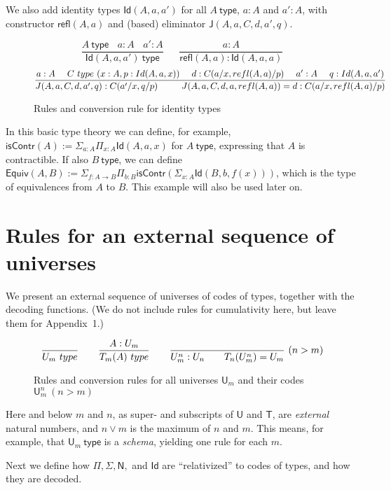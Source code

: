 \documentclass[a4paper,UKenglish,cleveref, autoref, thm-restate]{lipics-v2021}
\newcommand{\Id}{\mathsf{Id}}
\newcommand{\NN}{\mathsf{N}}
\newcommand{\UU}{\mathsf{U}}
\newcommand{\JJ}{\mathsf{J}}
\newcommand{\type}{\mathsf{type}}
\newcommand{\mypi}[3]{\Pi_{#1:#2}#3}
\newcommand{\mysig}[3]{\Sigma_{#1:#2}#3}
\newcommand{\sapp}[2]{{#1(#2)}} %
\newcommand{\Idapp}[3]{\sapp{\Id}{#1,#2,#3}}
\newcommand{\Rfapp}[2]{\sapp{\refl}{#1,#2}}
\newcommand{\Japp}[6]{\sapp{\JJ}{#1,#2,#3,#4,#5,#6}}
\newcommand{\T}{\mathsf{T}}
\newcommand{\Equiv}{\mathsf{Equiv}}
\newcommand{\isContr}{\mathsf{isContr}}
\newcommand{\refl}{\mathsf{refl}}
\begin{document}
We also add identity types $\Idapp{A}{a}{a'}$ for all $A~\type$,
$a:A$ and $a':A$, with constructor $\Rfapp{A}{a}$ and (based) eliminator
$\Japp{A}{a}{C}{d}{a'}{q}$.

\begin{figure}[H]
  \caption{Rules and conversion rule for identity types}\label{fig:typeId}
$$
\frac{A~\type ~~~~ a:A ~~~~ a':A}{\Idapp{A}{a}{a'}~\type}~~~~~~~
\frac{a:A}{\Rfapp{A}{a}:\Idapp{A}{a}{a}}
$$
$$
\frac{a:A~~~~C~\type~(x:A,p:\Idapp{A}{a}{x})~~~~d:C(a/x,\Rfapp{A}{a}/p)
~~~~a':A~~~~q:\Idapp{A}{a}{a'}}
{\Japp{A}{a}{C}{d}{a'}{q}: C(a'/x,q/p) ~~~~~~~~
 \Japp{A}{a}{C}{d}{a}{\Rfapp{A}{a}} = d : C(a/x,\Rfapp{A}{a}/p)}
\belowdisplayshortskip 0pt
$$
\end{figure}

In this basic type theory we can define, for example,
$\isContr(A) := \mysig{a}{A}{\mypi{x}{A}{\Id(A,a,x)}}$
for $A~\type$, expressing that $A$ is contractible.
If also $B~\type$, we can define $\Equiv(A,B) :=
\mysig{f}{A\to B}{\mypi{b}{B}{\isContr(\mysig{x}{A}{\Id(B,b,f(x))})}}$,
which is the type of equivalences from $A$ to $B$. This example
will also be used later on.

\section{Rules for an external sequence of universes}\label{sec:external}

We present an external sequence of universes of codes of types, together
with the decoding functions. (We do not include rules for cumulativity here, but leave them for Appendix~1.)

\begin{figure}[H]
  \caption{Rules and conversion rules for all universes $\UU_m$ and their codes $\UU^{n}_{m}~(n>m)$}\label{fig:typeU}
$$
\frac{}{\UU_m~\type}~~~~~~
\frac{A:\UU_{m}}{\T_{m}(A)~\type}~~~~~~
\frac{}{\UU^{n}_{m}:\UU_{n}~~~~~~\T_{n}({\UU^{n}_{m}}) = \UU_{m}}{~(n>m)}
\belowdisplayshortskip 0pt
$$
\end{figure}

Here and below $m$ and $n$, as super- and subscripts of $\UU$ and $\T$,
are \emph{external} natural numbers, and $n \vee m$ is the
maximum of $n$ and $m$. This means, for example, that $\UU_m~\type$ is
a \emph{schema}, yielding one rule for each $m$.

Next we define how $\Pi, \Sigma, \NN,$ and $\Id$ are ``relativized'' to
codes of types, and how they are decoded.
\end{document}
